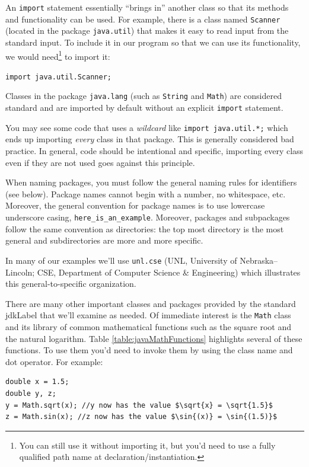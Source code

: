 An \texttt{import} statement essentially ``brings in'' another
class so that its methods and functionality can be used.  For example, 
there is a class named \texttt{Scanner} (located in the
package \texttt{java.util}) that makes it easy to read input
from the standard input.  To include it in our program so that we can
use its functionality, we would need\footnote{You
can still use it without importing it, but you'd need to use a fully
qualified path name at declaration/instantiation.} to import it: 

\texttt{import java.util.Scanner;}

Classes in the package \texttt{java.lang} (such as 
\texttt{String} and \texttt{Math}) are 
considered standard and are imported by default without an 
explicit \texttt{import} statement.  

You may see some code that uses a \emph{wildcard} like
\texttt{import java.util.*;} which ends up importing
\emph{every} class in that package.  This is generally considered bad
practice.  In general, code should be intentional and specific, 
importing every class even if they are not used goes against
this principle. 

When naming packages, you must follow the general naming 
rules for identifiers (see below).  Package names cannot begin
with a number, no whitespace, etc.  Moreover, the general
convention for package names is to use lowercase underscore
casing, \texttt{here_is_an_example}.  Moreover, 
packages and subpackages follow the same convention as
directories: the top most directory is the most general and
subdirectories are more and more specific.  

In many of our examples we'll use \texttt{unl.cse} 
(UNL, University of Nebraska--Lincoln; CSE, Department of
Computer Science \& Engineering) which illustrates this 
general-to-specific organization.

There are many other important classes and packages provided by the
standard \gls{jdkLabel} that we'll examine as needed.  Of immediate
interest is the \texttt{Math} class and its library of
common mathematical functions such as the square root and the natural 
logarithm.  Table \ref{table:javaMathFunctions} highlights several of 
these functions.  To use them you'd need to invoke them by using the
class name and dot operator.  For example:

\begin{verbatim}
double x = 1.5;
double y, z;
y = Math.sqrt(x); //y now has the value $\sqrt{x} = \sqrt{1.5}$
z = Math.sin(x); //z now has the value $\sin{(x)} = \sin{(1.5)}$
\end{verbatim}

